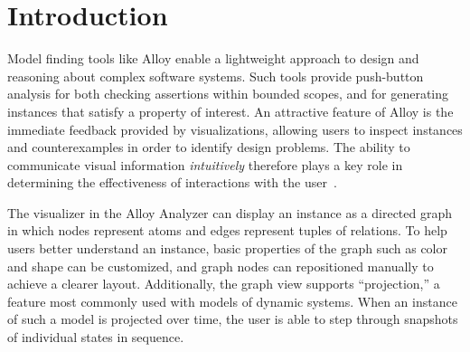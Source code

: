 \documentclass[runningheads]{llncs}
\begin{document}


\section{Introduction}
\label{introduction}

Model finding tools like Alloy enable a lightweight approach to design and reasoning about complex software systems. Such tools provide push-button analysis for both checking assertions within bounded scopes, and for generating instances that satisfy a property of interest. An attractive feature of Alloy is the immediate feedback provided by visualizations, allowing users to inspect instances and counterexamples in order to identify design problems. The ability to communicate visual information \emph{intuitively} therefore plays a key role in determining the effectiveness of interactions with the user~\cite{gammaitoni2014}.

The visualizer in the Alloy Analyzer can display an instance as a directed graph in which nodes represent atoms and edges represent tuples of relations.
To help users better understand an instance, basic properties of the graph such as color and shape can be customized, and graph nodes can repositioned manually to achieve a clearer layout.
Additionally, the graph view supports ``projection,'' a feature most commonly used with models of dynamic systems. 
When an instance of such a model is projected over time, the user is able to step through snapshots of individual states in sequence.
\end{document}
